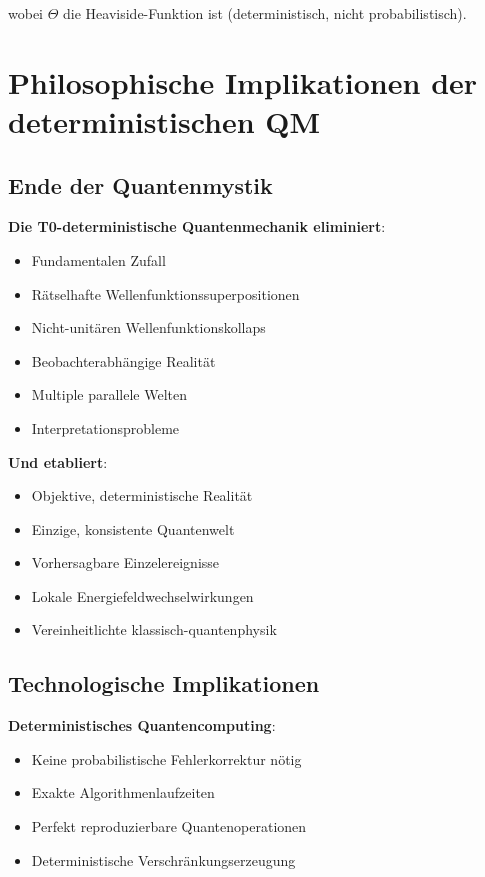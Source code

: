 \documentclass[12pt,a4paper]{article}
\theoremstyle{definition}
\theoremstyle{remark}
\begin{document}
wobei $\Theta$ die Heaviside-Funktion ist (deterministisch, nicht probabilistisch).

\section{Philosophische Implikationen der deterministischen QM}

\subsection{Ende der Quantenmystik}

\begin{tcolorbox}[colback=green!5!white,colframe=green!75!black,title=Deterministische Quantenrealit{\"a}t]
	\textbf{Die T0-deterministische Quantenmechanik eliminiert}:
	\begin{itemize}
		\item Fundamentalen Zufall
		\item R{\"a}tselhafte Wellenfunktionssuperpositionen
		\item Nicht-unit{\"a}ren Wellenfunktionskollaps
		\item Beobachterabh{\"a}ngige Realit{\"a}t
		\item Multiple parallele Welten
		\item Interpretationsprobleme
	\end{itemize}
	
	\textbf{Und etabliert}:
	\begin{itemize}
		\item Objektive, deterministische Realit{\"a}t
		\item Einzige, konsistente Quantenwelt
		\item Vorhersagbare Einzelereignisse
		\item Lokale Energiefeldwechselwirkungen
		\item Vereinheitlichte klassisch-quantenphysik
	\end{itemize}
\end{tcolorbox}

\subsection{Technologische Implikationen}

\textbf{Deterministisches Quantencomputing}:
\begin{itemize}
	\item Keine probabilistische Fehlerkorrektur n{\"o}tig
	\item Exakte Algorithmenlaufzeiten
	\item Perfekt reproduzierbare Quantenoperationen
	\item Deterministische Verschr{\"a}nkungserzeugung
\end{itemize}
\end{document}
